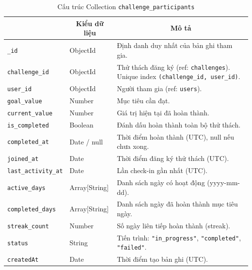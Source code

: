 \begin{table}[H]
\centering
\footnotesize
\setlength{\tabcolsep}{5pt}
\renewcommand{\arraystretch}{1.15}
\begin{tabularx}{\textwidth}{|p{3.8cm}|p{2.6cm}|X|}
\hline
\rowcolor{dbheadblue}
\multicolumn{1}{|c|}{\color{white}\textbf{Trường}} &
\multicolumn{1}{c|}{\color{white}\textbf{Kiểu dữ liệu}} &
\multicolumn{1}{c|}{\color{white}\textbf{Mô tả}} \\
\hline
\texttt{\_id}              & ObjectId      & Định danh duy nhất của bản ghi tham gia. \\ \hline
\rowcolor{dbrowalt}
\texttt{challenge\_id}     & ObjectId      & Thử thách đăng ký (ref: \texttt{challenges}). Unique index \texttt{(challenge\_id, user\_id)}. \\ \hline
\texttt{user\_id}          & ObjectId      & Người tham gia (ref: \texttt{users}). \\ \hline
\rowcolor{dbrowalt}
\texttt{goal\_value}       & Number        & Mục tiêu cần đạt. \\ \hline
\texttt{current\_value}    & Number        & Giá trị hiện tại đã hoàn thành. \\ \hline
\rowcolor{dbrowalt}
\texttt{is\_completed}     & Boolean       & Đánh dấu hoàn thành toàn bộ thử thách. \\ \hline
\texttt{completed\_at}     & Date / null   & Thời điểm hoàn thành (UTC), null nếu chưa xong. \\ \hline
\rowcolor{dbrowalt}
\texttt{joined\_at}        & Date          & Thời điểm đăng ký thử thách (UTC). \\ \hline
\texttt{last\_activity\_at} & Date          & Lần check-in gần nhất (UTC). \\ \hline
\rowcolor{dbrowalt}
\texttt{active\_days}      & Array[String] & Danh sách ngày có hoạt động (yyyy-mm-dd). \\ \hline
\texttt{completed\_days}   & Array[String] & Danh sách ngày đã hoàn thành mục tiêu ngày. \\ \hline
\rowcolor{dbrowalt}
\texttt{streak\_count}     & Number        & Số ngày liên tiếp hoàn thành (streak). \\ \hline
\texttt{status}           & String        & Tiến trình: \texttt{"in\_progress"}, \texttt{"completed"}, \texttt{"failed"}. \\ \hline
\rowcolor{dbrowalt}
\texttt{createdAt}        & Date          & Thời điểm tạo bản ghi (UTC). \\ \hline
\end{tabularx}
\caption{Cấu trúc Collection \texttt{challenge\_participants}}
\label{tab:col_challenge_participants}
\end{table}


